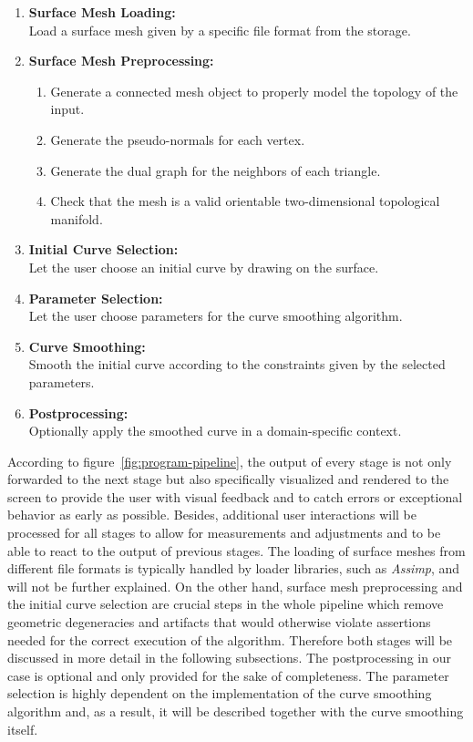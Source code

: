\documentclass{stdlocal}
\begin{document}
  \begin{enumerate}
    \item \textbf{Surface Mesh Loading:}\\
      Load a surface mesh given by a specific file format from the storage.
    \item \textbf{Surface Mesh Preprocessing:}
      \begin{enumerate}
        \item Generate a connected mesh object to properly model the topology of the input.
        \item Generate the pseudo-normals for each vertex.
        \item Generate the dual graph for the neighbors of each triangle.
        \item Check that the mesh is a valid orientable two-dimensional topological manifold.
      \end{enumerate}
    \item \textbf{Initial Curve Selection:} \\
      Let the user choose an initial curve by drawing on the surface.
    \item \textbf{Parameter Selection:} \\
      Let the user choose parameters for the curve smoothing algorithm.
    \item \textbf{Curve Smoothing:} \\
      Smooth the initial curve according to the constraints given by the selected parameters.
    \item \textbf{Postprocessing:} \\
      Optionally apply the smoothed curve in a domain-specific context.
  \end{enumerate}
  According to figure~\ref{fig:program-pipeline}, the output of every stage is not only forwarded to the next stage but also specifically visualized and rendered to the screen to provide the user with visual feedback and to catch errors or exceptional behavior as early as possible.
  Besides, additional user interactions will be processed for all stages to allow for measurements and adjustments and to be able to react to the output of previous stages.
  The loading of surface meshes from different file formats is typically handled by loader libraries, such as \textit{Assimp}, and will not be further explained.
  On the other hand, surface mesh preprocessing and the initial curve selection are crucial steps in the whole pipeline which remove geometric degeneracies and artifacts that would otherwise violate assertions needed for the correct execution of the algorithm.
  Therefore both stages will be discussed in more detail in the following subsections.
  The postprocessing in our case is optional and only provided for the sake of completeness.
  The parameter selection is highly dependent on the implementation of the curve smoothing algorithm and, as a result, it will be described together with the curve smoothing itself.
\end{document}

